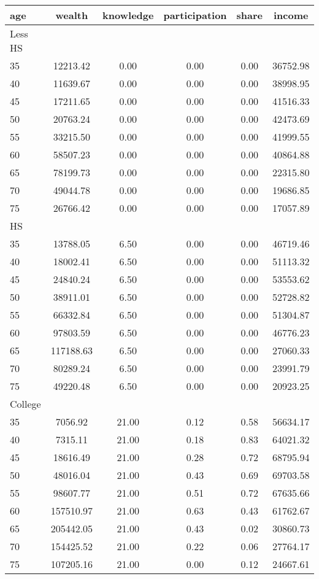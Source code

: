  \begin{tabular}{lccccc}
 \hline \hline
  age & wealth & knowledge & participation & share & income \\
 \hline
 Less HS & & & & & \\
 \hline
35 &  12213.42 &      0.00 &      0.00 &      0.00 &  36752.98 \\ 
40 &  11639.67 &      0.00 &      0.00 &      0.00 &  38998.95 \\ 
45 &  17211.65 &      0.00 &      0.00 &      0.00 &  41516.33 \\ 
50 &  20763.24 &      0.00 &      0.00 &      0.00 &  42473.69 \\ 
55 &  33215.50 &      0.00 &      0.00 &      0.00 &  41999.55 \\ 
60 &  58507.23 &      0.00 &      0.00 &      0.00 &  40864.88 \\ 
65 &  78199.73 &      0.00 &      0.00 &      0.00 &  22315.80 \\ 
70 &  49044.78 &      0.00 &      0.00 &      0.00 &  19686.85 \\ 
75 &  26766.42 &      0.00 &      0.00 &      0.00 &  17057.89 \\ 
 \hline
 HS & & & & & \\
 \hline
35 &  13788.05 &      6.50 &      0.00 &      0.00 &  46719.46 \\ 
40 &  18002.41 &      6.50 &      0.00 &      0.00 &  51113.32 \\ 
45 &  24840.24 &      6.50 &      0.00 &      0.00 &  53553.62 \\ 
50 &  38911.01 &      6.50 &      0.00 &      0.00 &  52728.82 \\ 
55 &  66332.84 &      6.50 &      0.00 &      0.00 &  51304.87 \\ 
60 &  97803.59 &      6.50 &      0.00 &      0.00 &  46776.23 \\ 
65 & 117188.63 &      6.50 &      0.00 &      0.00 &  27060.33 \\ 
70 &  80289.24 &      6.50 &      0.00 &      0.00 &  23991.79 \\ 
75 &  49220.48 &      6.50 &      0.00 &      0.00 &  20923.25 \\ 
 \hline
 College & & & & & \\
 \hline
35 &   7056.92 &     21.00 &      0.12 &      0.58 &  56634.17 \\ 
40 &   7315.11 &     21.00 &      0.18 &      0.83 &  64021.32 \\ 
45 &  18616.49 &     21.00 &      0.28 &      0.72 &  68795.94 \\ 
50 &  48016.04 &     21.00 &      0.43 &      0.69 &  69703.58 \\ 
55 &  98607.77 &     21.00 &      0.51 &      0.72 &  67635.66 \\ 
60 & 157510.97 &     21.00 &      0.63 &      0.43 &  61762.67 \\ 
65 & 205442.05 &     21.00 &      0.43 &      0.02 &  30860.73 \\ 
70 & 154425.52 &     21.00 &      0.22 &      0.06 &  27764.17 \\ 
75 & 107205.16 &     21.00 &      0.00 &      0.12 &  24667.61 \\ 
 \hline \hline
 \end{tabular}
